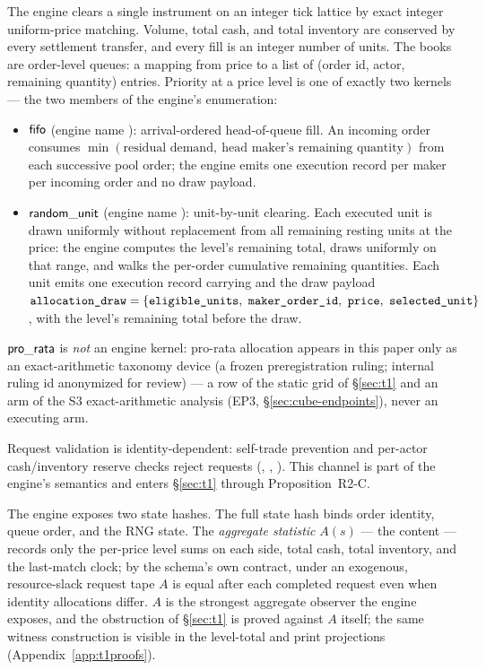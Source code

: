 The engine clears a single instrument on an integer tick lattice by exact
integer uniform-price matching. Volume, total cash, and total inventory are
conserved by every settlement transfer, and every fill is an integer number of
units. The books are order-level queues: a mapping from price to a list of
(order id, actor, remaining quantity) entries. Priority at a price level is one
of exactly two kernels --- the two members of the engine's
 enumeration:
\begin{itemize}
\item $\mathsf{fifo}$ (engine name ): arrival-ordered head-of-queue fill.
An incoming order consumes $\min(\text{residual demand},\ \text{head maker's
remaining quantity})$ from each successive pool order; the engine emits one
execution record per maker per incoming order and no draw payload.
\item $\mathsf{random\_unit}$ (engine name ): unit-by-unit
clearing. Each executed unit is drawn uniformly without replacement from all
remaining resting units at the price: the engine computes the level's remaining
total, draws  uniformly on that range, and walks the
per-order cumulative remaining quantities. Each unit emits one execution
record carrying  and the draw payload
$\fld{allocation_draw} = \{,\ \fld{maker\_order\_id},\
\fld{price},\ \fld{selected\_unit}\}$, with \fld{eligible\_units} the level's
remaining total before the draw.
\end{itemize}
$\mathsf{pro\_rata}$ is \emph{not} an engine kernel: pro-rata allocation appears in
this paper only as an exact-arithmetic taxonomy device (a frozen
preregistration ruling; internal ruling id anonymized for review) --- a
row of the static grid of \S\ref{sec:t1} and an arm of the S3
exact-arithmetic analysis (EP3, \S\ref{sec:cube-endpoints}), never an
executing arm.

Request validation is identity-dependent: self-trade prevention and per-actor
cash/inventory reserve checks reject requests
(, ,
). This channel is part of the engine's semantics
and enters \S\ref{sec:t1} through Proposition~R2-C.

The engine exposes two state hashes. The full state hash binds order identity,
queue order, and the RNG state. The \emph{aggregate statistic}
$A(s)$ --- the  content --- records only the
per-price level sums on each side, total cash, total inventory, and the
last-match clock; by the schema's own contract, under an exogenous,
resource-slack request tape $A$ is equal after each completed request even
when identity allocations differ. $A$ is the strongest aggregate observer the
engine exposes, and the obstruction of \S\ref{sec:t1} is proved against $A$
itself; the same witness construction is visible in the level-total and print
projections (Appendix~\ref{app:t1proofs}).

